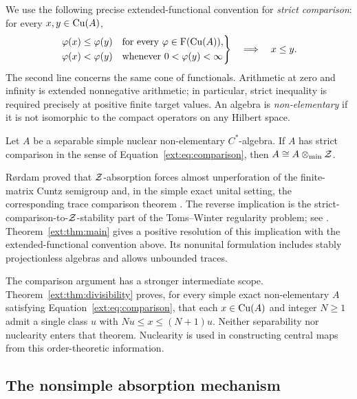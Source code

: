 We use the following precise extended-functional convention for
\emph{strict comparison}: for every $x,y\in\mathrm{Cu}(A)$,
\begin{equation}
\label{ext:eq:comparison}
\left.
\begin{aligned}
 \varphi(x)&\le\varphi(y)
       &&\text{for every }\varphi\in\mathrm F(\mathrm{Cu}(A)),\\
 \varphi(x)&<\varphi(y)
       &&\text{whenever }0<\varphi(y)<\infty
\end{aligned}
\right\}
\quad\Longrightarrow\quad x\le y.
\end{equation}
The second line concerns the same cone of functionals. Arithmetic at
zero and infinity is extended nonnegative arithmetic; in particular,
strict inequality is required precisely at positive finite target
values. An algebra is \emph{non-elementary} if it is not isomorphic to
the compact operators on any Hilbert space.

\begin{theorem}
\label{ext:thm:main}
Let $A$ be a separable simple nuclear non-elementary $C^*$-algebra.
If $A$ has strict comparison in the sense of
Equation~\eqref{ext:eq:comparison}, then $A\cong A\otimes_{\min}\mathcal Z$.
\end{theorem}

R\o rdam proved that $\mathcal Z$-absorption forces almost unperforation of
the finite-matrix Cuntz semigroup and, in the simple exact unital
setting, the corresponding trace comparison theorem
\cite[Theorem~4.5 and Corollary~4.6]{Rordam2004}. The reverse
implication is the strict-comparison-to-$\mathcal Z$-stability part of the
Toms--Winter regularity problem; see
\cite[Conjecture~5 and Problem~XVIII]{Problems2025}.
Theorem~\ref{ext:thm:main} gives a positive resolution of this
implication with the extended-functional convention above. Its
nonunital formulation includes stably projectionless algebras and
allows unbounded traces.

The comparison argument has a stronger intermediate scope.
Theorem~\ref{ext:thm:divisibility} proves, for every simple exact
non-elementary $A$ satisfying Equation~\eqref{ext:eq:comparison},
that each $x\in\mathrm{Cu}(A)$ and integer $N\ge1$ admit a single class $u$
with $Nu\le x\le(N+1)u$. Neither separability nor nuclearity enters
that theorem. Nuclearity is used in constructing central maps from
this order-theoretic information.

\subsection{The nonsimple absorption mechanism}

